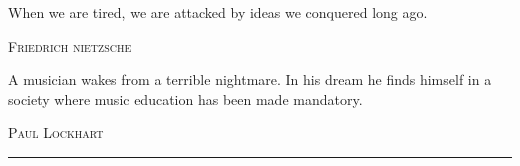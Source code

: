 \begin{titlepage}

\noindent
\par


\epigraph{When we are tired, we are attacked 
by ideas we conquered long ago.}
    {\textsc{Friedrich nietzsche}}
\epigraph{ A musician wakes from a terrible nightmare. In his dream he finds
himself in a society where music education has been made mandatory.}
    {\textsc{Paul Lockhart}}

\null\vfill
\vspace*{1cm}
\noindent
\hfill
\begin{minipage}{0.35\linewidth}
    \begin{flushright}
        \printauthor%
    \end{flushright}
\end{minipage}
%
\begin{minipage}{0.02\linewidth}
    \rule{1pt}{125pt}
\end{minipage}
\titlepagedecoration%
\end{titlepage}
